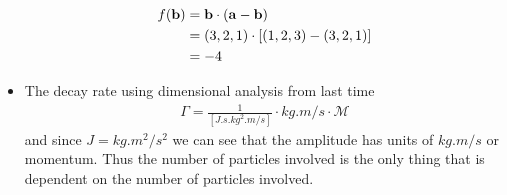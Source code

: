 \documentclass[../main.tex]{subfiles}
\begin{document}
\begin{itemize}
\begin{align*}
        f(\vb b) &= \vb b \cdot (\vb a - \vb b) \\
        &= (3,2,1) \cdot [(1,2,3) - (3,2,1)] \\
        &= -4
    \end{align*}
    \item The decay rate using dimensional analysis from last time
    \begin{align*}
        \Gamma = \frac{1}{[\unit{J.s.kg^2.m\per s}]} \cdot \unit{kg.m\per s} \cdot \mathcal{M}
    \end{align*}
    and since $\unit{J} = \unit{kg.m^2\per s^2}$ we can see that the amplitude has units of
    $\unit{kg.m\per s}$ or momentum. Thus the number of particles involved is the only thing that
    is dependent on the number of particles involved.
\end{itemize}
\end{document}

